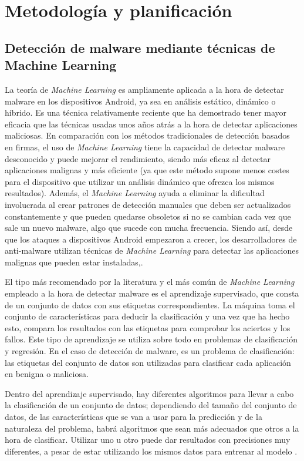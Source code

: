 \chapter{Metodología y planificación}

\section{Detección de malware mediante técnicas de Machine Learning}

La teoría de \textit{Machine Learning} es ampliamente aplicada a la hora de detectar malware en los dispositivos Android, ya sea en análisis estático, dinámico o híbrido. Es una técnica relativamente reciente que ha demostrado tener mayor eficacia que las técnicas usadas unos años atrás a la hora de detectar aplicaciones maliciosas. En comparación con los métodos tradicionales de detección basados en firmas, el uso de \textit{Machine Learning} tiene la capacidad de detectar malware desconocido y puede mejorar el rendimiento, siendo más eficaz al detectar aplicaciones malignas y más eficiente (ya que este método supone menos costes para el dispositivo que utilizar un análisis dinámico que ofrezca los mismos resultados). Además, el \textit{Machine Learning} ayuda a eliminar la dificultad involucrada al crear patrones de detección manuales que deben ser actualizados constantemente y que pueden quedarse obsoletos si no se cambian cada vez que sale un nuevo malware, algo que sucede con mucha frecuencia. Siendo así, desde que los ataques a dispositivos Android empezaron a crecer, los desarrolladores de anti-malware utilizan técnicas de \textit{Machine Learning} para detectar las aplicaciones malignas que pueden estar instaladas\hypersetup{citecolor=red}\cite{liu},\hypersetup{citecolor=red}\cite{oluwakemi}.

El tipo más recomendado por la literatura y el más común de \textit{Machine Learning} empleado a la hora de detectar malware es el aprendizaje supervisado, que consta de un conjunto de datos con sus etiquetas correspondientes. La máquina toma el conjunto de características para deducir la clasificación y una vez que ha hecho esto, compara los resultados con las etiquetas para comprobar los aciertos y los fallos. Este tipo de aprendizaje se utiliza sobre todo en problemas de clasificación y regresión. En el caso de detección de malware, es un problema de clasificación: las etiquetas del conjunto de datos son utilizadas para clasificar cada aplicación en benigna o maliciosa.

Dentro del aprendizaje supervisado, hay diferentes algoritmos para llevar a cabo la clasificación de un conjunto de datos; dependiendo del tamaño del conjunto de datos, de las características que se van a usar para la predicción y de la naturaleza del problema, habrá algoritmos que sean más adecuados que otros a la hora de clasificar. Utilizar uno u otro puede dar resultados con precisiones muy diferentes, a pesar de estar utilizando los mismos datos para entrenar al modelo \hypersetup{citecolor=red}\cite{martin}.

